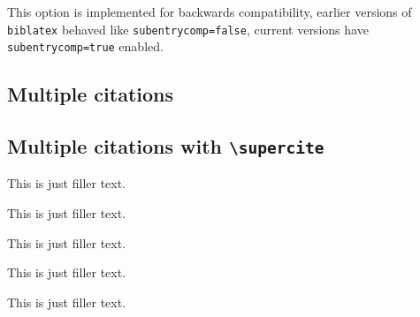 \documentclass[a4paper]{article}
\newcommand{\cmd}[1]{\texttt{\textbackslash #1}}
\begin{document}
This option is implemented for backwards compatibility,
earlier versions of \texttt{biblatex} behaved like
\texttt{subentrycomp=false}, current versions have
\texttt{subentrycomp=true} enabled.

\subsection*{Multiple citations}

\cite{bertram,augustine}

\cite{murray,bertram,augustine,companion,cotton}

\cite{augustine,bertram,cotton,hammond,set,massa,murray}

\cite{bertram,companion,cotton,augustine,massa,set,hammond,murray,stdmodel}

\cite{yoon,weinberg}

\subsection*{Multiple citations with \cmd{supercite}}

This is just filler text.\supercite{bertram,augustine}

This is just filler text.\supercite{murray,bertram,augustine,companion,cotton}

This is just filler text.\supercite{augustine,bertram,cotton,hammond,set,massa,murray}

This is just filler text.\supercite{bertram,companion,cotton,augustine,massa,set,hammond,murray,stdmodel}

This is just filler text.\supercite{yoon,weinberg}

\clearpage
\printbibliography
\end{document}
